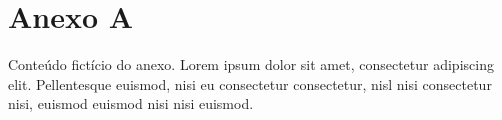 \chapter{Anexo A}
Conteúdo fictício do anexo. Lorem ipsum dolor sit amet, consectetur adipiscing elit. Pellentesque euismod, nisi eu consectetur consectetur, nisl nisi consectetur nisi, euismod euismod nisi nisi euismod.
